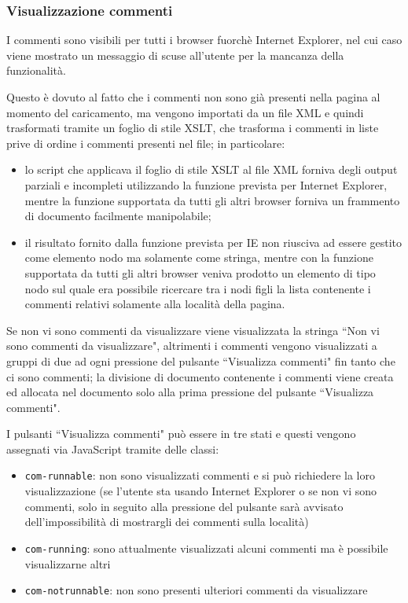 \subsubsection{Visualizzazione commenti}\label{sec:visComm}
I commenti sono visibili per tutti i browser fuorchè Internet Explorer, nel
cui caso viene mostrato un messaggio di scuse all'utente per la mancanza della
funzionalità.

Questo è dovuto al fatto che i commenti non sono già presenti nella pagina al
momento del caricamento, ma vengono importati da un file XML e quindi
trasformati tramite un foglio di stile XSLT, che trasforma i commenti in liste
prive di ordine i commenti presenti nel file; in particolare:
\begin{itemize}
\item lo script che applicava il foglio di stile XSLT al file XML forniva
degli output parziali e incompleti utilizzando la funzione prevista per
Internet Explorer, mentre la funzione supportata da tutti gli altri browser
forniva un frammento di documento facilmente manipolabile;
\item il risultato fornito dalla funzione prevista per IE non riusciva ad
essere gestito come elemento nodo ma solamente come stringa, mentre con
la funzione supportata da tutti gli altri browser veniva prodotto un elemento
di tipo nodo sul quale era possibile ricercare tra i nodi figli la lista
contenente i commenti relativi solamente alla località della pagina.
\end{itemize}

Se non vi sono commenti da visualizzare viene visualizzata la stringa
``Non vi sono commenti da visualizzare", altrimenti i commenti vengono
visualizzati a gruppi di due ad ogni pressione del pulsante
``Visualizza commenti" fin tanto che ci sono commenti; la divisione di
documento contenente i commenti viene creata ed allocata nel documento solo
alla prima pressione del pulsante ``Visualizza commenti".

I pulsanti ``Visualizza commenti" può essere in tre stati e questi vengono
assegnati via JavaScript tramite delle classi:
\begin{itemize}
\item \texttt{com-runnable}: non sono visualizzati commenti e si può
richiedere la loro visualizzazione (se l'utente sta usando
Internet Explorer o se non vi sono commenti, solo in seguito alla pressione
del pulsante sarà avvisato dell'impossibilità di mostrargli dei commenti sulla
località)
\item \texttt{com-running}: sono attualmente visualizzati alcuni commenti ma è
possibile visualizzarne altri
\item \texttt{com-notrunnable}: non sono presenti ulteriori commenti da
visualizzare
\end{itemize}


